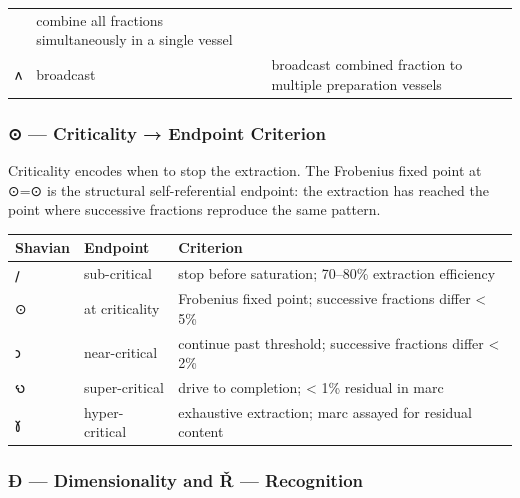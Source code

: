 \documentclass[12pt,a4paper]{article}
\begin{document}
\begin{longtable}[]{@{}lll@{}}
\begin{minipage}[t]{0.30\columnwidth}
\end{minipage} & \begin{minipage}[t]{0.30\columnwidth}\raggedright
combine all fractions simultaneously in a single vessel\strut
\end{minipage}\tabularnewline
\begin{minipage}[t]{0.30\columnwidth}\raggedright
𐑵\strut
\end{minipage} & \begin{minipage}[t]{0.30\columnwidth}\raggedright
broadcast\strut
\end{minipage} & \begin{minipage}[t]{0.30\columnwidth}\raggedright
broadcast combined fraction to multiple preparation vessels\strut
\end{minipage}\tabularnewline
\bottomrule
\end{longtable}

\hypertarget{criticality-endpoint-criterion}{%
\subsubsection{⊙ --- Criticality → Endpoint
Criterion}\label{criticality-endpoint-criterion}}

Criticality encodes when to stop the extraction. The Frobenius fixed
point at ⊙=⊙ is the structural self-referential endpoint: the extraction
has reached the point where successive fractions reproduce the same
pattern.

\begin{longtable}[]{@{}lll@{}}
\toprule
Shavian & Endpoint & Criterion\tabularnewline
\midrule
\endhead
𐑢 & sub-critical & stop before saturation; 70--80\% extraction
efficiency\tabularnewline
⊙ & at criticality & Frobenius fixed point; successive fractions differ
\textless{} 5\%\tabularnewline
𐑮 & near-critical & continue past threshold; successive fractions differ
\textless{} 2\%\tabularnewline
𐑻 & super-critical & drive to completion; \textless{} 1\% residual in
marc\tabularnewline
𐑣 & hyper-critical & exhaustive extraction; marc assayed for residual
content\tabularnewline
\bottomrule
\end{longtable}

\hypertarget{uxf0-dimensionality-and-ux159-recognition}{%
\subsubsection{Ð --- Dimensionality and Ř ---
Recognition}\label{uxf0-dimensionality-and-ux159-recognition}}
\end{document}
